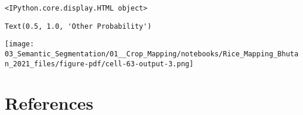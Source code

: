 \documentclass[
  letterpaper,
  DIV=11,
  numbers=noendperiod]{scrreprt}
\newlength{\cslhangindent}
\newenvironment{CSLReferences}[2] %
 {\begin{list}{}{%
  \setlength{\itemindent}{0pt}
  \setlength{\leftmargin}{0pt}
  \setlength{\parsep}{0pt}
  \ifodd #1
   \setlength{\leftmargin}{\cslhangindent}
   \setlength{\itemindent}{-1\cslhangindent}
  \fi
  \setlength{\itemsep}{#2\baselineskip}}}
 {\end{list}}
\begin{document}
\begin{verbatim}
<IPython.core.display.HTML object>
\end{verbatim}

\begin{verbatim}
Text(0.5, 1.0, 'Other Probability')
\end{verbatim}

\texttt{[image: 03\_Semantic\_Segmentation/01\_\_Crop\_Mapping/notebooks/Rice\_Mapping\_Bhutan\_2021\_files/figure-pdf/cell-63-output-3.png]}


\chapter*{References}\label{references}


\label{refs}
\begin{CSLReferences}{0}{1}
\end{CSLReferences}
\end{document}
